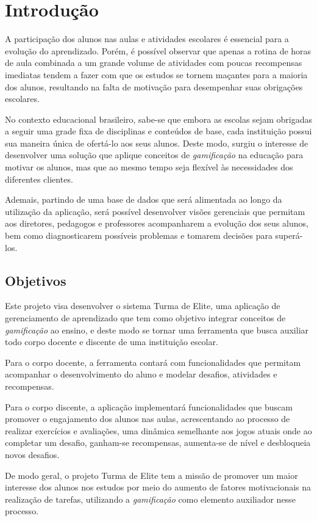 \chapter[Introdução]{Introdução}
A participação dos alunos nas aulas e atividades escolares é essencial para a evolução do aprendizado. Porém, é possível observar que apenas a rotina de horas de aula combinada a um grande volume de atividades com poucas recompensas imediatas tendem a fazer com que os estudos se tornem maçantes para a maioria dos alunos, resultando na falta de motivação para desempenhar suas obrigações escolares.


No contexto educacional brasileiro, sabe-se que embora as escolas sejam obrigadas a seguir uma grade fixa de disciplinas e conteúdos de base, cada instituição possui sua maneira única de ofertá-lo aos seus alunos. Deste modo, surgiu o interesse de desenvolver uma solução que aplique conceitos de \textit{gamificação} na educação para motivar os alunos, mas que ao mesmo tempo seja flexível às necessidades dos diferentes clientes. 


Ademais, partindo de uma base de dados que será alimentada ao longo da utilização da aplicação, será possível desenvolver visões gerenciais que permitam aos diretores, pedagogos e professores acompanharem a evolução dos seus alunos, bem como diagnosticarem possíveis problemas e tomarem decisões para superá-los.

\section{Objetivos}
Este projeto visa desenvolver o sistema Turma de Elite, uma aplicação de gerenciamento de aprendizado que tem como objetivo integrar conceitos de \textit{gamificação} ao ensino, e deste modo se tornar uma ferramenta que busca auxiliar todo corpo docente e discente de uma instituição escolar.


Para o corpo docente, a ferramenta contará com funcionalidades que permitam acompanhar o desenvolvimento do aluno e modelar desafios, atividades e recompensas.


Para o corpo discente, a aplicação implementará funcionalidades que buscam promover o engajamento dos alunos nas aulas, acrescentando ao processo de realizar exercícios e avaliações, uma dinâmica semelhante aos jogos atuais onde ao completar um desafio, ganham-se recompensas, aumenta-se de nível e desbloqueia novos desafios.

De modo geral, o projeto Turma de Elite tem a missão de promover um maior interesse dos alunos nos estudos por meio do aumento de fatores motivacionais na realização de tarefas, utilizando a \textit{gamificação} como elemento auxiliador nesse processo.

